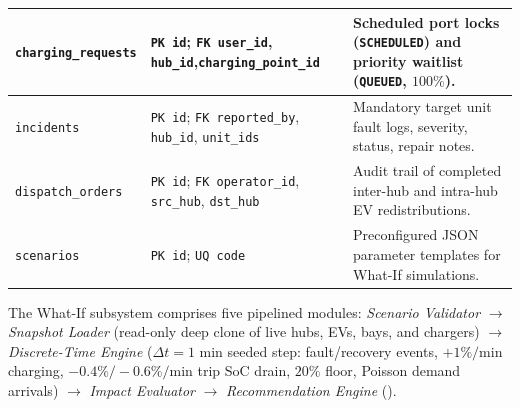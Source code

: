 \begin{table}[H]
\begin{tabularx}{\textwidth}{|L{3.5cm}|L{4.3cm}|Y|}
    \hline
    \texttt{charging\_requests} & \texttt{PK id}; \texttt{FK user\_id}, \texttt{hub\_id},\newline\texttt{charging\_\allowbreak point\_id} & Scheduled port locks (\texttt{SCHEDULED}) and priority waitlist (\texttt{QUEUED}, $100\%$). \\
    \hline
    \texttt{incidents} & \texttt{PK id}; \texttt{FK reported\_by}, \texttt{hub\_id}, \texttt{unit\_ids} & Mandatory target unit fault logs, severity, status, repair notes. \\
    \hline
    \texttt{dispatch\_orders} & \texttt{PK id}; \texttt{FK operator\_id}, \texttt{src\_hub}, \texttt{dst\_hub} & Audit trail of completed inter-hub and intra-hub EV redistributions. \\
    \hline
    \texttt{scenarios} & \texttt{PK id}; \texttt{UQ code} & Preconfigured JSON parameter templates for What-If simulations. \\
    \hline
  \end{tabularx}
\end{table}

\label{subsec:what-if-design}
The What-If subsystem comprises five pipelined modules: \emph{Scenario Validator} $\rightarrow$ \emph{Snapshot Loader} (read-only deep clone of live hubs, EVs, bays, and chargers) $\rightarrow$ \emph{Discrete-Time Engine} ($\Delta t = 1\text{ min}$ seeded step: fault/recovery events, $+1\%/\text{min}$ charging, $-0.4\%/-0.6\%/\text{min}$ trip SoC drain, $20\%$ floor, Poisson demand arrivals) $\rightarrow$ \emph{Impact Evaluator} $\rightarrow$ \emph{Recommendation Engine} ().

